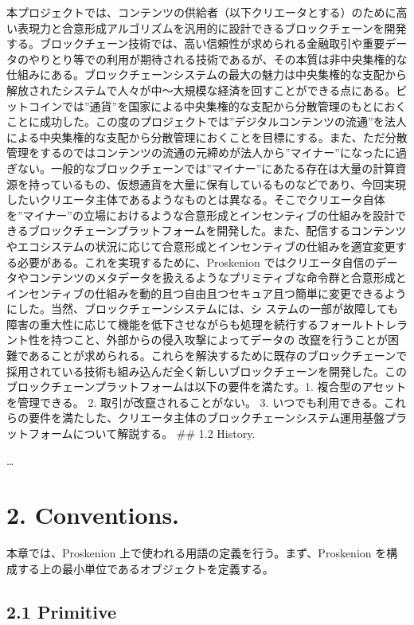 本プロジェクトでは、コンテンツの供給者（以下クリエータとする）のために高い表現力と合意形成アルゴリズムを汎用的に設計できるブロックチェーンを開発する。ブロックチェーン技術では、高い信頼性が求められる金融取引や重要データのやりとり等での利用が期待される技術であるが、その本質は非中央集権的な仕組みにある。ブロックチェーンシステムの最大の魅力は中央集権的な支配から解放されたシステムで人々が中〜大規模な経済を回すことができる点にある。ビットコインでは''通貨''を国家による中央集権的な支配から分散管理のもとにおくことに成功した。この度のプロジェクトでは''デジタルコンテンツの流通''を法人による中央集権的な支配から分散管理におくことを目標にする。また、ただ分散管理をするのではコンテンツの流通の元締めが法人から''マイナー''になったに過ぎない。一般的なブロックチェーンでは''マイナー''にあたる存在は大量の計算資源を持っているもの、仮想通貨を大量に保有しているものなどであり、今回実現したいクリエータ主体であるようなものとは異なる。そこでクリエータ自体を''マイナー''の立場におけるような合意形成とインセンティブの仕組みを設計できるブロックチェーンプラットフォームを開発した。また、配信するコンテンツやエコシステムの状況に応じて合意形成とインセンティブの仕組みを適宜変更する必要がある。これを実現するために、Proskenion
ではクリエータ自信のデータやコンテンツのメタデータを扱えるようなプリミティブな命令群と合意形成とインセンティブの仕組みを動的且つ自由且つセキュア且つ簡単に変更できるようにした。当然、ブロックチェーンシステムには、シ
ステムの一部が故障しても障害の重大性に応じて機能を低下させながらも処理を続行するフォールトトレラント性を持つこと、外部からの侵入攻撃によってデータの
改竄を行うことが困難であることが求められる。これらを解決するために既存のブロックチェーンで採用されている技術も組み込んだ全く新しいブロックチェーンを開発した。このブロックチェーンプラットフォームは以下の要件を満たす。1.
複合型のアセットを管理できる。 2. 取引が改竄されることがない。 3.
いつでも利用できる。これらの要件を満たした、クリエータ主体のブロックチェーンシステム運用基盤プラットフォームについて解説する。
\#\# 1.2 History.

\ldots{}

\hypertarget{conventions.}{%
\chapter{2. Conventions.}\label{conventions.}}

本章では、Proskenion 上で使われる用語の定義を行う。まず、Proskenion
を構成する上の最小単位であるオブジェクトを定義する。

\hypertarget{primitive}{%
\section{2.1 Primitive}\label{primitive}}

